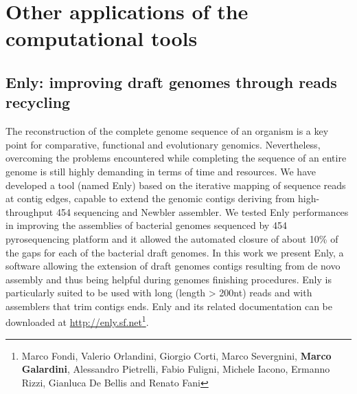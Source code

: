 \logvartrue
\chapter{Other applications of the computational tools}
\label{sec:appendix1}

\section{Enly: improving draft genomes through reads recycling}
The reconstruction of the complete genome sequence of an organism is a key point for comparative, functional and evolutionary genomics. Nevertheless, overcoming the problems encountered while completing the sequence of an entire genome is still highly demanding in terms of time and resources.
We have developed a tool (named Enly) based on the iterative mapping of sequence reads at contig edges, capable to extend the genomic contigs deriving from high-throughput 454 sequencing and Newbler assembler. We tested Enly performances in improving the assemblies of bacterial genomes sequenced by 454 pyrosequencing platform and it allowed the automated closure of about 10\% of the gaps for each of the bacterial draft genomes.
In this work we present Enly, a software allowing the extension of draft genomes contigs resulting from de novo assembly and thus being helpful during genomes finishing procedures. Enly is particularly suited to be used with long (length > 200nt) reads and with assemblers that trim contigs ends. Enly and its related documentation can be downloaded at \href{http://enly.sf.net}{http://enly.sf.net}\footnote{Marco Fondi, Valerio Orlandini, Giorgio Corti, Marco Severgnini, \textbf{Marco Galardini}, Alessandro Pietrelli, Fabio Fuligni, Michele Iacono, Ermanno Rizzi, Gianluca De Bellis and Renato Fani}.

